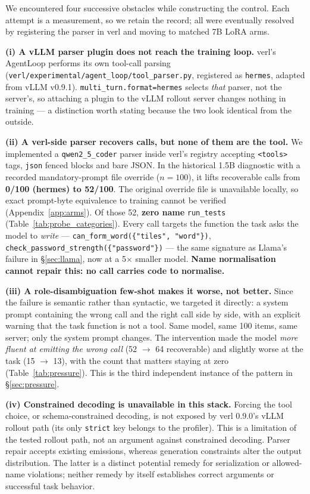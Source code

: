 We encountered four successive obstacles while constructing the control. Each attempt is a
measurement, so we retain the record; all were eventually resolved by registering the parser in
verl and moving to matched 7B LoRA arms.

\textbf{(i) A vLLM parser plugin does not reach the training loop.} verl's AgentLoop performs its
own tool-call parsing (\texttt{verl/experimental/agent\_loop/tool\_parser.py}, registered as
\texttt{hermes}, adapted from vLLM v0.9.1). \texttt{multi\_turn.format=hermes} selects \emph{that}
parser, not the server's, so attaching a plugin to the vLLM rollout server changes nothing in
training --- a distinction worth stating because the two look identical from the outside.

\textbf{(ii) A verl-side parser recovers calls, but none of them are the tool.} We implemented a
\texttt{qwen2\_5\_coder} parser inside verl's registry accepting \texttt{<tools>} tags,
\texttt{json} fenced blocks and bare JSON. In the historical 1.5B diagnostic with a recorded
mandatory-prompt file override ($n{=}100$), it lifts recoverable calls from
\textbf{0/100 (hermes) to 52/100}. The original override file is unavailable locally,
so exact prompt-byte equivalence to training cannot be verified (Appendix~\ref{app:arms}). Of those 52,
\textbf{zero name} \texttt{run\_tests} (Table~\ref{tab:probe_categories}). Every call targets the
function the task asks the model to \emph{write} --- \texttt{can\_form\_word(\{"tiles", "word"\})},
\texttt{check\_password\_strength(\{"password"\})} --- the same signature as Llama's failure in
\S\ref{sec:llama}, now at a 5$\times$ smaller model. \textbf{Name normalisation cannot repair
this: no call carries code to normalise.}

\textbf{(iii) A role-disambiguation few-shot makes it worse, not better.} Since the failure is
semantic rather than syntactic, we targeted it directly: a system prompt containing the wrong call
and the right call side by side, with an explicit warning that the task function is not a tool.
Same model, same 100 items, same server; only the system prompt changes. The intervention made the
model \emph{more fluent at emitting the wrong call} (52 $\to$ 64 recoverable) and slightly worse at
the task (15 $\to$ 13), with the count that matters staying at zero
(Table~\ref{tab:pressure}). This is the third independent instance of the pattern in
\S\ref{sec:pressure}.

\textbf{(iv) Constrained decoding is unavailable in this stack.} Forcing the tool choice, or
schema-constrained decoding, is not exposed by verl 0.9.0's vLLM rollout path (its only
\texttt{strict} key belongs to the profiler). This is a limitation of the tested rollout path, not an argument against constrained decoding.
Parser repair accepts existing emissions, whereas generation constraints alter the output
distribution. The latter is a distinct potential remedy for serialization or allowed-name
violations; neither remedy by itself establishes correct arguments or successful task behavior.
